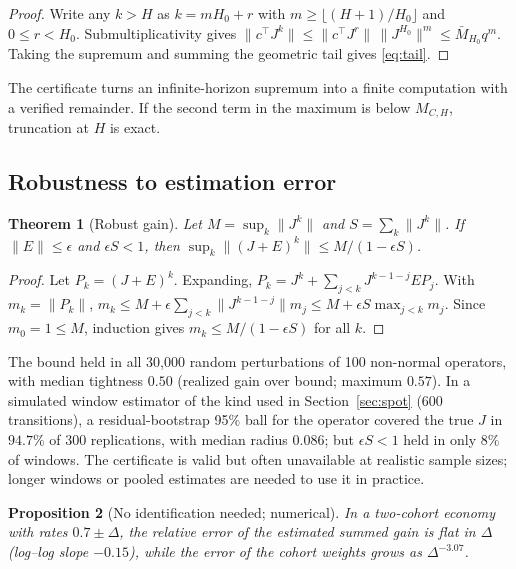 \documentclass[12pt]{article}
\newtheorem{theorem}{Theorem}[section]
\newtheorem{proposition}[theorem]{Proposition}
\theoremstyle{definition}
\theoremstyle{remark}
\begin{document}
\begin{proof}
Write any $k>H$ as $k=mH_0+r$ with $m\ge\lfloor(H+1)/H_0\rfloor$ and $0\le r<H_0$. Submultiplicativity gives $\|c^\top J^k\|\le\|c^\top J^r\|\,\|J^{H_0}\|^m\le\bar M_{H_0}q^m$. Taking the supremum and summing the geometric tail gives \eqref{eq:tail}.
\end{proof}

The certificate turns an infinite-horizon supremum into a finite computation with a verified remainder. If the second term in the maximum is below $M_{C,H}$, truncation at $H$ is exact.

\subsection{Robustness to estimation error}

\begin{theorem}[Robust gain]\label{thm:robust}
Let $M=\sup_k\|J^k\|$ and $S=\sum_k\|J^k\|$. If $\|E\|\le\epsilon$ and $\epsilon S<1$, then $\sup_k\|(J+E)^k\|\le M/(1-\epsilon S)$.
\end{theorem}

\begin{proof}
Let $P_k=(J+E)^k$. Expanding, $P_k=J^k+\sum_{j<k}J^{k-1-j}EP_j$. With $m_k=\|P_k\|$, $m_k\le M+\epsilon\sum_{j<k}\|J^{k-1-j}\|m_j\le M+\epsilon S\max_{j<k}m_j$. Since $m_0=1\le M$, induction gives $m_k\le M/(1-\epsilon S)$ for all $k$.
\end{proof}

The bound held in all 30,000 random perturbations of 100 non-normal operators, with median tightness $0.50$ (realized gain over bound; maximum $0.57$). In a simulated window estimator of the kind used in Section~\ref{sec:spot} (600 transitions), a residual-bootstrap 95\% ball for the operator covered the true $J$ in $94.7\%$ of 300 replications, with median radius $0.086$; but $\epsilon S<1$ held in only $8\%$ of windows. The certificate is valid but often unavailable at realistic sample sizes; longer windows or pooled estimates are needed to use it in practice.

\begin{proposition}[No identification needed; numerical]\label{prop:bridge}
In a two-cohort economy with rates $0.7\pm\Delta$, the relative error of the estimated summed gain is flat in $\Delta$ (log--log slope $-0.15$), while the error of the cohort weights grows as $\Delta^{-3.07}$.
\end{proposition}
\end{document}
